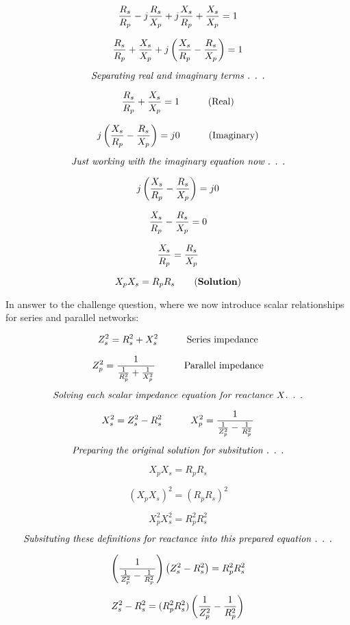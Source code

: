 $${R_s \over R_p} - j{R_s \over X_p} + j{X_s \over R_p} + {X_s \over X_p} = 1$$

$${R_s \over R_p} + {X_s \over X_p} + j\left({X_s \over R_p} - {R_s \over X_p} \right) = 1$$

$$\hbox{\it Separating real and imaginary terms . . .}$$

$${R_s \over R_p} + {X_s \over X_p} = 1 \hbox{\hskip 30pt (Real)}$$

$$j \left({X_s \over R_p} - {R_s \over X_p}\right) = j0 \hbox{\hskip 30pt (Imaginary)}$$

$$\hbox{\it Just working with the imaginary equation now . . .}$$

$$j \left({X_s \over R_p} - {R_s \over X_p}\right) = j0$$

$${X_s \over R_p} - {R_s \over X_p} = 0$$

$${X_s \over R_p} = {R_s \over X_p}$$

$$X_p X_s = R_p R_s \hbox{\hskip 20pt ({\bf Solution})}$$

\vskip 10pt

In answer to the challenge question, where we now introduce scalar relationships for series and parallel networks:

$$Z_s^2 = R_s^2 + X_s^2 \hbox{\hskip 30pt Series impedance}$$

$$Z_p^2 = {1 \over {{1 \over R_p^2} + {1 \over X_p^2}}} \hbox{\hskip 30pt Parallel impedance}$$

$$\hbox{\it Solving each scalar impedance equation for reactance }X \hbox{\it . . .}$$

$$X_s^2 = Z_s^2 - R_s^2 \hbox{\hskip 30pt} X_p^2 = {1 \over {{1 \over Z_p^2} - {1 \over R_p^2}}}$$

\goodbreak

$$\hbox{\it Preparing the original solution for subsitution . . .}$$

$$X_p X_s = R_p R_s$$

$$(X_p X_s)^2 = (R_p R_s)^2$$

$$X_p^2 X_s^2 = R_p^2 R_s^2$$

$$\hbox{\it Subsituting these definitions for reactance into this prepared equation . . .}$$

$$\left({1 \over {{1 \over Z_p^2} - {1 \over R_p^2}}}\right) \left(Z_s^2 - R_s^2\right) = R_p^2 R_s^2$$


$$Z_s^2 - R_s^2 = (R_p^2 R_s^2) \left({1 \over Z_p^2} - {1 \over R_p^2}\right)$$

